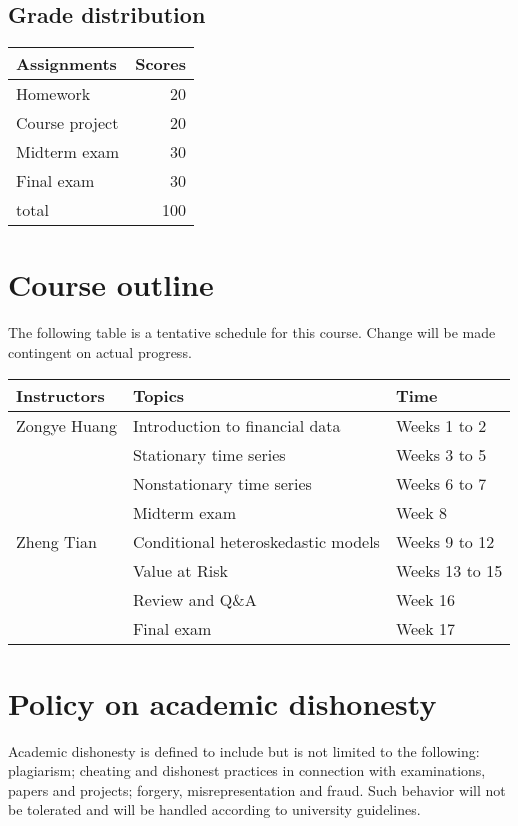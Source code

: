 \documentclass[11pt]{article}
\begin{document}
\subsection*{Grade distribution}
\label{sec:org1530288}

\begin{center}
\begin{tabular}{lr}
Assignments & Scores\\
\hline
Homework & 20\\
Course project & 20\\
Midterm exam & 30\\
Final exam & 30\\
\hline
total & 100\\
\end{tabular}
\end{center}


\section{Course outline}
\label{sec:orga456d1b}

The following table is a tentative schedule for this course. Change
will be made contingent on actual progress.

\begin{center}
\begin{tabular}{lll}
Instructors & Topics & Time\\
\hline
Zongye Huang & Introduction to financial data & Weeks 1 to 2\\
 & Stationary time series & Weeks 3 to 5\\
 & Nonstationary time series & Weeks 6 to 7\\
 & Midterm exam & Week 8\\
\hline
Zheng Tian & Conditional heteroskedastic models & Weeks 9 to 12\\
 & Value at Risk & Weeks 13 to 15\\
 & Review and Q\&A & Week 16\\
\hline
 & Final exam & Week 17\\
\end{tabular}
\end{center}


\section{Policy on academic dishonesty}
\label{sec:org251e3f7}

Academic dishonesty is defined to include but is not limited to the
following: plagiarism; cheating and dishonest practices in connection
with examinations, papers and projects; forgery, misrepresentation and
fraud. Such behavior will not be tolerated and will be handled
according to university guidelines.
\end{document}
